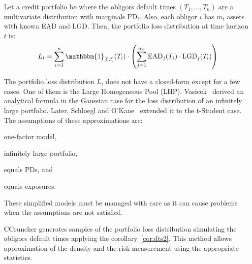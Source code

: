 \documentclass[11pt,fleqn]{book} %
\begin{document}
Let a credit portfolio be where the obligors default times $(T_1,\dots,T_n)$ 
are a multivariate distribution with marginals $\text{PD}_i$. Also, each 
obligor $i$ has $m_i$ assets with known EAD and LGD\@. Then, the portfolio 
loss distribution at time horizon $t$ is:
\begin{displaymath}
	L_t = \displaystyle \sum_{i=1}^n \mathbbm{1}_{[0,t]}(T_i) \cdot 
	\left( 
	\sum_{j=1}^{m_i} \text{EAD}_j(T_i) \cdot \text{LGD}_j(T_i)
	\right)
\end{displaymath}

The portfolio loss distribution $L_t$ does not have a closed-form except 
for a few cases. One of them is the Large Homogeneous Pool (LHP).
Vasicek~\cite{vasicek:1987} derived an analytical formula in the Gaussian 
case for the loss distribution of an infinitely large portfolio. Later, 
Schloegl and O'Kane~\cite{schloegl:2005} extended it to the t-Student 
case. The assumptions of these approximations are: 
\begin{inparaenum}[1)]
	\item one-factor model, 
	\item infinitely large portfolio, 
	\item equals PDs, and
	\item equals exposures.
\end{inparaenum}
These simplified models must be managed 
with care as it can cause problems~\cite{long:2012} when the assumptions 
are not satisfied.

CCruncher generates samples of the portfolio loss distribution simulating 
the obligors default times applying the corollary~\ref{cor:dts2}.
This method allows approximation of the density and the risk measurement 
using the appropriate statistics.
\end{document}
